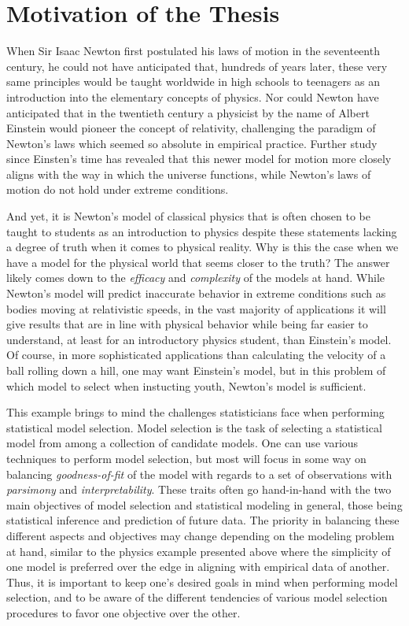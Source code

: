 \doublespace
{}
		\section{Motivation of the Thesis}
		When Sir Isaac Newton first postulated his laws of motion in the seventeenth century, he could not have anticipated that, hundreds of years later, these very same principles would
		be taught worldwide in high schools to teenagers as an introduction into the elementary concepts of physics. Nor could Newton have anticipated that in the twentieth century a
		physicist by the name of Albert Einstein would pioneer the concept of relativity, challenging the paradigm of Newton's laws which seemed so absolute in empirical practice. Further study
		since Einsten's time has revealed that this newer model for motion more closely aligns with the way in which the universe functions, while Newton's laws of motion do not hold
		under extreme conditions.

		And yet, it is Newton's model of classical physics that is often chosen to be taught to students as an introduction to physics despite these statements lacking a degree of truth when
		it comes to physical reality. Why is this the case when we have a model for the physical world that seems closer to the truth? The answer likely comes down to the \textit{efficacy} and
		\textit{complexity} of the models at hand. While Newton's model will predict inaccurate behavior in extreme conditions such as bodies moving at relativistic speeds, in the
		vast majority of applications it will give results that are in line with physical behavior while being far easier to understand, at least for an introductory physics student, than 
		Einstein's model. Of course, in more sophisticated applications than calculating the velocity of a ball rolling down a hill, one may want Einstein's model, but in this problem of 
		which model to select when instucting youth, Newton's model is sufficient.

		This example brings to mind the challenges statisticians face when performing statistical model selection. Model selection is the task of selecting a statistical model from among a
		collection of candidate models. One can use various techniques to perform model selection, but most will focus in some way on balancing \textit{goodness-of-fit} of the model with
		regards to a set of observations with \textit{parsimony} and \textit{interpretability}. These traits often go hand-in-hand with the two main objectives of model selection and 
		statistical modeling in general, those being statistical inference and prediction of future data. The priority in balancing these different aspects and objectives may change depending
		on the modeling problem at hand, similar to the physics example presented above where the simplicity of one model is preferred over the edge in aligning with empirical data of another.
		Thus, it is important to keep one's desired goals in mind when performing model selection, and to be aware of the different tendencies of various model selection procedures to favor
		one objective over the other.

